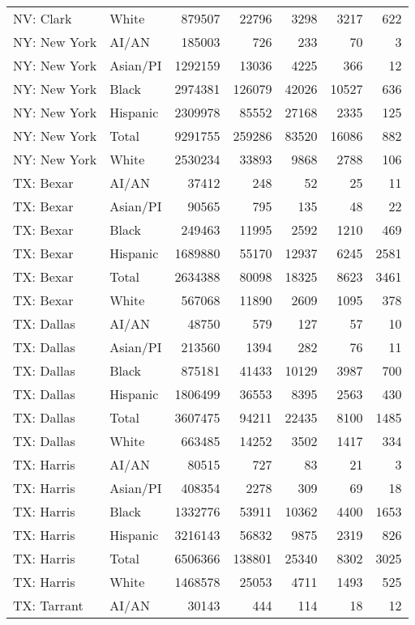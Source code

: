 \documentclass[9pt,twoside,lineno]{pnas-new}
\begin{document}
\begin{table}[ht]
\begin{tabular}{llrrrrr}
  NV: Clark & White & 879507 & 22796 & 3298 & 3217 & 622 \\ 
  NY: New York & AI/AN & 185003 & 726 & 233 & 70 & 3 \\ 
  NY: New York & Asian/PI & 1292159 & 13036 & 4225 & 366 & 12 \\ 
  NY: New York & Black & 2974381 & 126079 & 42026 & 10527 & 636 \\ 
  NY: New York & Hispanic & 2309978 & 85552 & 27168 & 2335 & 125 \\ 
  NY: New York & Total & 9291755 & 259286 & 83520 & 16086 & 882 \\ 
  NY: New York & White & 2530234 & 33893 & 9868 & 2788 & 106 \\ 
  TX: Bexar & AI/AN & 37412 & 248 & 52 & 25 & 11 \\ 
  TX: Bexar & Asian/PI & 90565 & 795 & 135 & 48 & 22 \\ 
  TX: Bexar & Black & 249463 & 11995 & 2592 & 1210 & 469 \\ 
  TX: Bexar & Hispanic & 1689880 & 55170 & 12937 & 6245 & 2581 \\ 
  TX: Bexar & Total & 2634388 & 80098 & 18325 & 8623 & 3461 \\ 
  TX: Bexar & White & 567068 & 11890 & 2609 & 1095 & 378 \\ 
  TX: Dallas & AI/AN & 48750 & 579 & 127 & 57 & 10 \\ 
  TX: Dallas & Asian/PI & 213560 & 1394 & 282 & 76 & 11 \\ 
  TX: Dallas & Black & 875181 & 41433 & 10129 & 3987 & 700 \\ 
  TX: Dallas & Hispanic & 1806499 & 36553 & 8395 & 2563 & 430 \\ 
  TX: Dallas & Total & 3607475 & 94211 & 22435 & 8100 & 1485 \\ 
  TX: Dallas & White & 663485 & 14252 & 3502 & 1417 & 334 \\ 
  TX: Harris & AI/AN & 80515 & 727 & 83 & 21 & 3 \\ 
  TX: Harris & Asian/PI & 408354 & 2278 & 309 & 69 & 18 \\ 
  TX: Harris & Black & 1332776 & 53911 & 10362 & 4400 & 1653 \\ 
  TX: Harris & Hispanic & 3216143 & 56832 & 9875 & 2319 & 826 \\ 
  TX: Harris & Total & 6506366 & 138801 & 25340 & 8302 & 3025 \\ 
  TX: Harris & White & 1468578 & 25053 & 4711 & 1493 & 525 \\ 
  TX: Tarrant & AI/AN & 30143 & 444 & 114 & 18 & 12 \\ 

\end{tabular}
\end{table}
\end{document}

